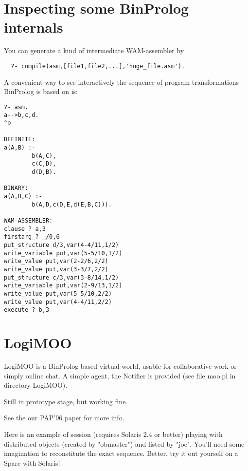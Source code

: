 \documentclass{article}
\begin{document}
\section{Inspecting some BinProlog internals}

{\flushleft You} can generate a kind of intermediate WAM-assembler by

\begin{verbatim}
  ?- compile(asm,[file1,file2,...],'huge_file.asm').
\end{verbatim}

{\flushleft A} convenient way to see interactively the sequence of program
transformations BinProlog is based on is:

\begin{verbatim}
?- asm.
a-->b,c,d.
^D

DEFINITE:
a(A,B) :- 
        b(A,C),
        c(C,D),
        d(D,B).

BINARY:
a(A,B,C) :- 
        b(A,D,c(D,E,d(E,B,C))).

WAM-ASSEMBLER:
clause_? a,3
firstarg_? _/0,6
put_structure d/3,var(4-4/11,1/2)
write_variable put,var(5-5/10,1/2)
write_value put,var(2-2/6,2/2)
write_value put,var(3-3/7,2/2)
put_structure c/3,var(3-8/14,1/2)
write_variable put,var(2-9/13,1/2)
write_value put,var(5-5/10,2/2)
write_value put,var(4-4/11,2/2)
execute_? b,3
\end{verbatim}


\section{LogiMOO}

LogiMOO is a BinProlog based virtual world, usable for collaborative
work or simply online chat. A simple agent, the Notifier is provided
(see file moo.pl in directory LogiMOO).

Still in prototype stage, but working fine. 

See the our PAP'96 paper \cite{DPT96:PAP} for more info.

Here is an example of session (requires Solaris 2.4 or better) playing
with distributed objects (created by "obmaster") and listed by "joe".
You'll need some imagination to reconstitute the exact sequence.
Better, try it out yourself on a Sparc with Solaris!
\end{document}
